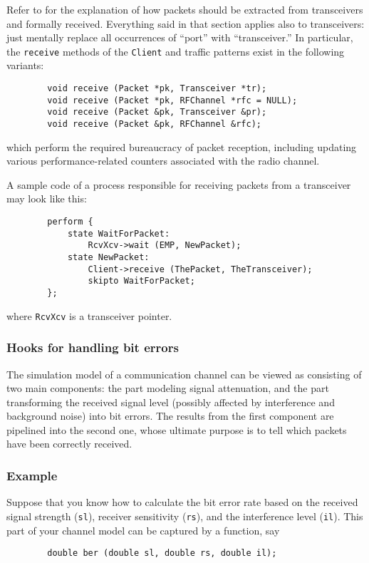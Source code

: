 Refer to  for the explanation of how packets should be
extracted from transceivers and formally received.
Everything said in that section applies also to transceivers: just mentally
replace all occurrences of ``port'' with ``transceiver.''
In particular, the {\tt receive} methods of the {\tt Client} and
traffic patterns exist in the following variants:
\begin{verbatim}
        void receive (Packet *pk, Transceiver *tr);
        void receive (Packet *pk, RFChannel *rfc = NULL);
        void receive (Packet &pk, Transceiver &pr);
        void receive (Packet &pk, RFChannel &rfc);
\end{verbatim}
\noindent
which perform the required bureaucracy of packet reception, including updating
various performance-related counters associated with the radio channel.

A sample code of a process responsible for receiving packets from a transceiver
may look like this:
\begin{verbatim}
        perform {
            state WaitForPacket:
                RcvXcv->wait (EMP, NewPacket);
            state NewPacket:
                Client->receive (ThePacket, TheTransceiver);
                skipto WaitForPacket;
        };
\end{verbatim}
\noindent
where {\tt RcvXcv} is a transceiver pointer.

\subsubsection{Hooks for handling bit errors}
\label{rm_tr_ac_be}

The simulation model of a communication channel can be viewed as consisting of
two main components: the part modeling signal attenuation, and the part
transforming the received signal level (possibly affected by interference
and background noise) into bit errors.
The results from the first component are pipelined into the
second one, whose ultimate purpose is to tell which packets have
been correctly received.

\subsubsection*{Example}

Suppose that you know how to calculate the bit
error rate based on the received signal strength ({\tt sl}),
receiver sensitivity ({\tt rs}), and the interference level ({\tt il}).
This part of your channel model can be captured by a function, say
\begin{verbatim}
        double ber (double sl, double rs, double il);
\end{verbatim}

